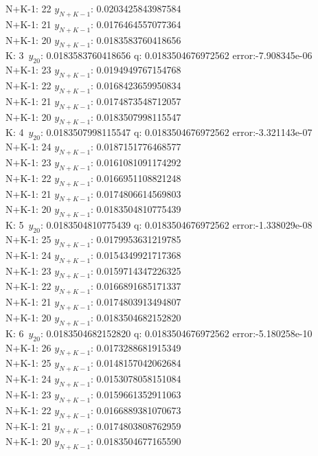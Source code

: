 \documentclass[12pt]{article}
\begin{document}
N+K-1:  22 $y_{N+K-1}$:   0.0203425843987584\\
N+K-1:  21 $y_{N+K-1}$:   0.0176464557077364\\
N+K-1:  20 $y_{N+K-1}$:   0.0183583760418656\\
K:  3\ $y_{20}$:  0.0183583760418656 q:  0.0183504676972562 error:-7.908345e-06 \\
N+K-1:  23 $y_{N+K-1}$:   0.0194949767154768\\
N+K-1:  22 $y_{N+K-1}$:   0.0168423659950834\\
N+K-1:  21 $y_{N+K-1}$:   0.0174873548712057\\
N+K-1:  20 $y_{N+K-1}$:   0.0183507998115547\\
K:  4\ $y_{20}$:  0.0183507998115547 q:  0.0183504676972562 error:-3.321143e-07 \\
N+K-1:  24 $y_{N+K-1}$:   0.0187151776468577\\
N+K-1:  23 $y_{N+K-1}$:   0.0161081091174292\\
N+K-1:  22 $y_{N+K-1}$:   0.0166951108821248\\
N+K-1:  21 $y_{N+K-1}$:   0.0174806614569803\\
N+K-1:  20 $y_{N+K-1}$:   0.0183504810775439\\
K:  5\ $y_{20}$:  0.0183504810775439 q:  0.0183504676972562 error:-1.338029e-08 \\
N+K-1:  25 $y_{N+K-1}$:   0.0179953631219785\\
N+K-1:  24 $y_{N+K-1}$:   0.0154349921717368\\
N+K-1:  23 $y_{N+K-1}$:   0.0159714347226325\\
N+K-1:  22 $y_{N+K-1}$:   0.0166891685171337\\
N+K-1:  21 $y_{N+K-1}$:   0.0174803913494807\\
N+K-1:  20 $y_{N+K-1}$:   0.0183504682152820\\
K:  6\ $y_{20}$:  0.0183504682152820 q:  0.0183504676972562 error:-5.180258e-10 \\
N+K-1:  26 $y_{N+K-1}$:   0.0173288681915349\\
N+K-1:  25 $y_{N+K-1}$:   0.0148157042062684\\
N+K-1:  24 $y_{N+K-1}$:   0.0153078058151084\\
N+K-1:  23 $y_{N+K-1}$:   0.0159661352911063\\
N+K-1:  22 $y_{N+K-1}$:   0.0166889381070673\\
N+K-1:  21 $y_{N+K-1}$:   0.0174803808762959\\
N+K-1:  20 $y_{N+K-1}$:   0.0183504677165590\\
\end{document}
